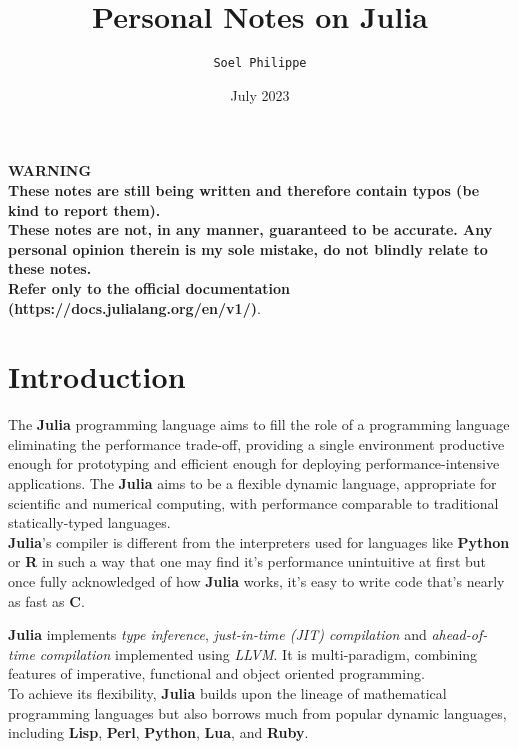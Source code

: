 \documentclass[
]{article}
\title{Personal Notes on \textbf{Julia}}
\author{\texttt{Soel Philippe}}
\date{July 2023}
\begin{document}
\maketitle
\tableofcontents
\newpage
\begin{minipage}[c][7cm][t]{\textwidth}
\vspace*{\fill}
\centering
{\Huge \textbf{WARNING}}\\
\textbf{These notes are still being written and therefore contain typos (be kind to report them).\\
These notes are not, in any manner, guaranteed to be accurate. Any personal opinion therein is my
sole mistake, do not blindly relate to these notes.\\
Refer only to the official documentation (https://docs.julialang.org/en/v1/)}.
\vspace*{\fill}
\end{minipage}
\newpage
\hypertarget{introduction}{%
\section{Introduction}\label{introduction}}

The \textbf{Julia} programming language aims to fill the role of a
programming language eliminating the performance trade-off, providing a
single environment productive enough for prototyping and efficient
enough for deploying performance-intensive applications. The
\textbf{Julia} aims to be a flexible dynamic language, appropriate for
scientific and numerical computing, with performance comparable to
traditional statically-typed languages.\\
\textbf{Julia}'s compiler is different from the interpreters used for
languages like \textbf{Python} or \textbf{R} in such a way that one may
find it's performance unintuitive at first but once fully acknowledged
of how \textbf{Julia} works, it's easy to write code that's nearly as
fast as \textbf{C}.

\textbf{Julia} implements \emph{type inference}, \emph{just-in-time
(JIT) compilation} and \emph{ahead-of-time compilation} implemented
using \emph{LLVM}. It is multi-paradigm, combining features of
imperative, functional and object oriented programming.\\
To achieve its flexibility, \textbf{Julia} builds upon the lineage of
mathematical programming languages but also borrows much from popular
dynamic languages, including \textbf{Lisp}, \textbf{Perl},
\textbf{Python}, \textbf{Lua}, and \textbf{Ruby}.
\end{document}
